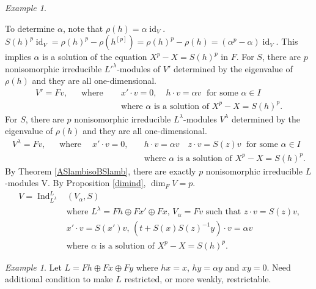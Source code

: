 \documentclass[12pt,MSc]{muthesis_2023}
\theoremstyle{plain}%
\theoremstyle{definition}
\theoremstyle{remark}
\newtheorem{Example}[FactCounter]{Example} %
\DeclareMathOperator{\id}{id}
\DeclareMathOperator{\Ind}{Ind}
\begin{document}
\begin{Example}
\begin{enumerate}
To determine $\alpha$, note that $\rho(h)=\alpha\id_V$. ${S(h)}^p\id_V={\rho(h)}^p-\rho(h^{[p]})={\rho(h)}^p-\rho(h)=(\alpha^p-\alpha)\id_V$. This implies $\alpha$ is a solution of the equation $X^p-X={S(h)}^p$ in $F$. For $S$, there are $p$ nonisomorphic irreducible $L'^{\lambda}$-modules of $V'$ determined by the eigenvalue of $\rho(h)$ and they are all one-dimensional.
\begin{align*}
V'=Fv,\;\;\quad\text{where} \; \quad &x' \cdot v=0,\quad h\cdot v=\alpha v \;\text{  for some }\alpha\in I\\
&\text{where $\alpha$ is a solution of $X^p-X={S(h)}^p$.}
\end{align*}
 For $S$, there are $p$ nonisomorphic irreducible $L^{\lambda}$-modules $V^{\lambda}$ determined by the eigenvalue of $\rho(h)$ and they are all one-dimensional.
\begin{align*}
V^{\lambda}=Fv,\;\;\quad\text{where} \; \quad x' \cdot v=0,\quad &h\cdot v=\alpha v  \quad z\cdot v=S(z)v\;\text{  for some }\alpha\in I\\
&\text{where $\alpha$ is a solution of $X^p-X={S(h)}^p$.}
\end{align*}
By Theorem \ref{ASlambisoBSlamb}, there are exactly $p$ nonisomorphic irreducible $L$-modules V. By Proposition \ref{dimind}, $\dim_FV=p$.
\begin{align*}
V=\Ind^L_{L^{\lambda}}&(V_{\alpha}, S) \\
&\text{where $L^{\lambda}=Fh\oplus Fx'\oplus Fx$, $V_{\alpha}=Fv$ such that $z\cdot v =S(z)v$,}\\
&\text{$x' \cdot v=S(x')v$, $(t+S(x){S(z)}^{-1}y)\cdot v =\alpha v$ }\\
&\text{where $\alpha$ is a solution of $X^p-X={S(h)}^p$. }
\end{align*}

\begin{Example}
Let $L=Fh\oplus Fx\oplus Fy$ where $hx=x$, $hy=\alpha y$ and $xy=0$. Need additional condition to make $L$ restricted, or more weakly, restrictable. 


\end{Example}
\end{enumerate}
\end{Example}
\end{document}
